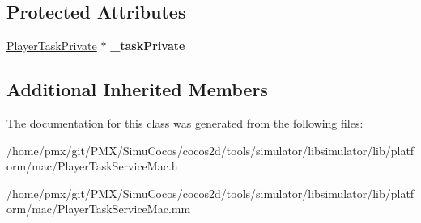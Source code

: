 \subsection*{Protected Attributes}
\begin{DoxyCompactItemize}
\item 
\mbox{\label{classPlayerTaskMac_a03b218a0c2807a428cad19d656063789}} 
\hyperlink{interfacePlayerTaskPrivate}{Player\+Task\+Private} $\ast$ {\bfseries \+\_\+task\+Private}
\end{DoxyCompactItemize}
\subsection*{Additional Inherited Members}


The documentation for this class was generated from the following files\+:\begin{DoxyCompactItemize}
\item 
/home/pmx/git/\+P\+M\+X/\+Simu\+Cocos/cocos2d/tools/simulator/libsimulator/lib/platform/mac/Player\+Task\+Service\+Mac.\+h\item 
/home/pmx/git/\+P\+M\+X/\+Simu\+Cocos/cocos2d/tools/simulator/libsimulator/lib/platform/mac/Player\+Task\+Service\+Mac.\+mm\end{DoxyCompactItemize}
